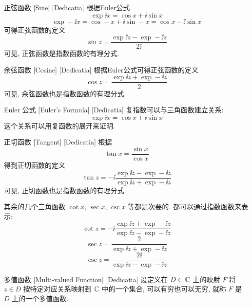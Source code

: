         \begin{dfn}
            [Sine]
            {正弦函数}
            [Sine]
            [Dedicatia]
            根据Euler公式
            \[\exp \ii x=\cos x+\ii\sin x\]
            \[\exp -\ii x=\cos -x+\ii\sin -x=\cos x-\ii\sin x\]
            可得正弦函数的定义
            \[\sin z=\frac{\exp\ii z-\exp -\ii z}{2\ii}\]
            可见, 正弦函数是指数函数的有理分式. 
        \end{dfn}

        \begin{dfn}
            [Cosine]
            {余弦函数}
            [Cosine]
            [Dedicatia]
            根据Euler公式可得正弦函数的定义
            \[\cos z=\frac{\exp\ii z+\exp -\ii z}{2}\]
            可见, 余弦函数也是指数函数的有理分式. 
        \end{dfn}

        \begin{thm}
            {Euler 公式}
            [Euler's Formula]
            [Dedicatia]
            复指数可以与三角函数建立关系: 
            \[\exp \ii x=\cos x+\ii\sin x\]
            这个关系可以用复函数的\PowerSeries 展开来证明. 
        \end{thm}

        \begin{dfn}
            [Tangent]
            {正切函数}
            [Tangent]
            [Dedicatia]
            根据
            \[\tan x=\frac{\sin x}{\cos x}\]
            得到正切函数的定义
            \[\tan z=-\ii\frac{\exp \ii z-\exp -\ii z}{\exp \ii z+\exp -\ii z}\]
            可见, 正切函数也是指数函数的有理分式. 
        \end{dfn}

        \begin{rmk}
            [Dedicatia]
            其余的几个三角函数 \(\cot x\),  \(\sec x\),  \(\csc x\) 等都是次要的. 都可以通过指数函数来表示:
            \[\cot z=-\ii\frac{\exp \ii z+\exp -\ii z}{\exp \ii z-\exp -\ii z}\]
            \[\sec z=\frac{2}{\exp \ii z+\exp -\ii z}\]
            \[\csc z=\frac{2\ii}{\exp \ii z-\exp -\ii z}\]
        \end{rmk}

        \begin{dfn}
            [Multivalued]
            {多值函数}
            [Multi-valued Function]
            [Dedicatia]
            设定义在 \(D\subset\operatorname{\mathbb{C}}\) 上的映射 \(F\) 将 \(z\in D\) 按特定对应关系映射到 \(\operatorname{\mathbb{C}}\) 中的一个集合, 可以有穷也可以无穷, 就称 \(F\) 是 \(D\) 上的一个多值函数. 
        \end{dfn}

